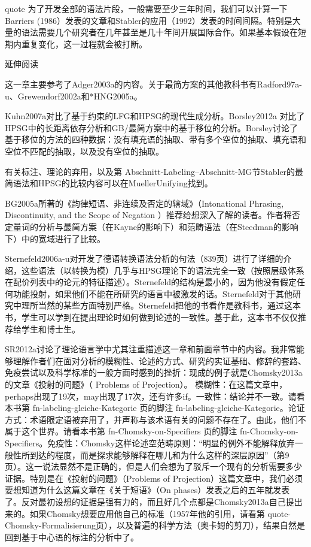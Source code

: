 quote
为了开发全部的语法片段，一般需要至少三年时间，我们可以计算一下Barriers (1986）发表的文章和Stabler的应用（1992）发表的时间间隔。特别是大量的语法需要几个研究者在几年甚至是几十年间开展国际合作。如果基本假设在短期内重复变化，这一过程就会被打断。





延伸阅读


这一章主要参考了Adger2003a的内容。关于最简方案的其他教科书有Radford97a-u、Grewendorf2002a和*HNG2005a。




Kuhn2007a对比了基于约束的LFG和HPSG的现代生成分析。Borsley2012a 对比了HPSG中的长距离依存分析和GB/最简方案中的基于移位的分析。Borsley讨论了基于移位的方法的四种数据：没有填充语的抽取、带有多个空位的抽取、填充语和空位不匹配的抽取，以及没有空位的抽取。





有关标注、理论的弃用，以及第 Abschnitt-Labeling--Abschnitt-MG节Stabler的最简语法和HPSG的比较内容可以在MuellerUnifying找到。



BG2005a所著的《韵律短语、非连续及否定的辖域》（Intonational Phrasing, Discontinuity, and the Scope of Negation ）推荐给想深入了解的读者。作者将否定量词的分析与最简方案（在Kayne的影响下）和范畴语法（在Steedman的影响下）中的宽域进行了比较。



Sternefeld2006a-u对开发了德语转换语法分析的句法（839页）进行了详细的介绍，这些语法（以转换为模）几乎与HPSG理论下的语法完全一致（按照层级体系在配价列表中的论元的特征描述）。Sternefeld的结构是最小的，因为他没有假定任何功能投射，如果他们不能在所研究的语言中被激发的话。Sternefeld对于其他研究中理所当然的某些方面特别严格。Sternefeld把他的书看作是教科书，通过这本书，学生可以学到在提出理论时如何做到论述的一致性。基于此，这本书不仅仅推荐给学生和博士生。







SR2012a讨论了理论语言学中尤其注重描述这一章和前面章节中的内容。我非常能够理解作者们在面对分析的模糊性、论述的方式、研究的实证基础、修辞的套路、免疫尝试以及科学标准的一般方面时感到的挫折：现成的例子就是Chomsky2013a的文章《投射的问题》（ Problems of Projection）。 
  模糊性：在这篇文章中，perhaps出现了19次，may出现了17次，还有许多if。一致性：结论并不一致。请看本书第 fn-labeling-gleiche-Kategorie 页的脚注 fn-labeling-gleiche-Kategorie。论证方式：术语限定语被弃用了，并声称与该术语有关的问题不存在了。由此，他们不属于这个世界。请看本书第 fn-Chomsky-on-Specifiers 页的脚注 fn-Chomsky-on-Specifiers。免疫性：Chomsky这样论述空范畴原则：“明显的例外不能解释放弃一般性所到达的程度，而是探求能够解释在哪儿和为什么这样的深层原因”（第9页）。这一说法显然不是正确的，但是人们会想为了驳斥一个现有的分析需要多少证据。特别是在《投射的问题》（Problems of Projection）这篇文章中，我们必须要想知道为什么这篇文章在《关于短语》（On phases）发表之后的五年就发表了。反对最初设想的证据是强有力的，而且好几个点都是Chomsky2013a自己提出来的。如果Chomsky想要应用他自己的标准（1957年他的引用，请看第 quote-Chomsky-Formalisierung页），以及普遍的科学方法（奥卡姆的剪刀），结果自然是回到基于中心语的标注的分析中了。
  
